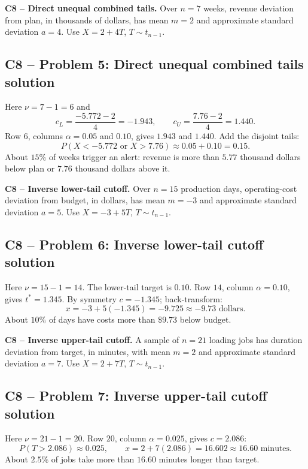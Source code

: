 {
\textbf{C8 -- Direct unequal combined tails.} Over $n=7$ weeks, revenue deviation from plan, in thousands of dollars, has mean $m=2$ and approximate standard deviation $a=4$. Use $X=2+4T$, $T\sim t_{n-1}$.
\label{sol:q5}
\subsection*{C8 -- Problem 5: Direct unequal combined tails solution }
Here $\nu=7-1=6$ and
\[
 c_L=\frac{-5.772-2}{4}=-1.943,\qquad c_U=\frac{7.76-2}{4}=1.440.
\]
Row $6$, columns $\alpha=0.05$ and $0.10$, gives $1.943$ and $1.440$.
Add the disjoint tails:
\[
 P(X<-5.772\text{ or }X>7.76)\approx0.05+0.10=\boxed{0.15}.
\]
About $15\%$ of weeks trigger an alert: revenue is more than $5.77$ thousand dollars below plan or $7.76$ thousand dollars above it.
\secInicio[sec:q5]
}

{
\textbf{C8 -- Inverse lower-tail cutoff.} Over $n=15$ production days, operating-cost deviation from budget, in dollars, has mean $m=-3$ and approximate standard deviation $a=5$. Use $X=-3+5T$, $T\sim t_{n-1}$.
\label{sol:q6}
\subsection*{C8 -- Problem 6: Inverse lower-tail cutoff solution }
Here $\nu=15-1=14$. The lower-tail target is $0.10$.
Row $14$, column $\alpha=0.10$, gives $t^*=1.345$.
By symmetry $c=-1.345$; back-transform:
\[
 x=-3+5(-1.345)=-9.725\approx\boxed{-9.73\text{ dollars}}.
\]
About $10\%$ of days have costs more than $\$9.73$ below budget.
\secInicio[sec:q6]
}

{
\textbf{C8 -- Inverse upper-tail cutoff.} A sample of $n=21$ loading jobs has duration deviation from target, in minutes, with mean $m=2$ and approximate standard deviation $a=7$. Use $X=2+7T$, $T\sim t_{n-1}$.
\label{sol:q7}
\subsection*{C8 -- Problem 7: Inverse upper-tail cutoff solution }
Here $\nu=21-1=20$. Row $20$, column $\alpha=0.025$, gives $c=2.086$:
\[
 P(T>2.086)\approx0.025,\qquad
 x=2+7(2.086)=16.602\approx\boxed{16.60\text{ minutes}}.
\]
About $2.5\%$ of jobs take more than $16.60$ minutes longer than target.
\secInicio[sec:q7]
}

